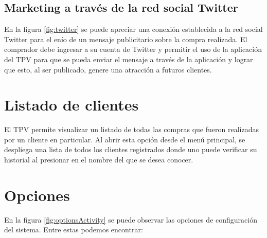 


\subsection{Marketing a trav\'es de la red social Twitter}
\label{subsec:ui.addsale.twitter}

En la figura \ref{fig:twitter} se puede apreciar una conexi\'on establecida a la red social Twitter para el en\'io de un mensaje publicitario sobre la compra realizada. El comprador debe ingresar a su cuenta de Twitter y permitir el uso de la aplicaci\'on del \ac{TPV} para que se pueda enviar el mensaje a trav\'es de la aplicaci\'on y lograr que esto, al ser publicado, genere una atracci\'on a futuros clientes.


\section{Listado de clientes}
\label{sec:ui.clientlist}

El \ac{TPV} permite visualizar un listado de todas las compras que fueron realizadas por un cliente en particular. Al abrir esta opci\'on desde el men\'u principal, se despliega una lista de todos los clientes registrados donde uno puede verificar su historial al presionar en el nombre del que se desea conocer.


\section{Opciones}
\label{sec:ui.options}

En la figura \ref{fig:optionsActivity} se puede observar las opciones de configuraci\'on del sistema. Entre estas podemos encontrar:

